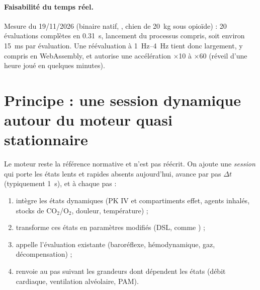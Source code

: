 \documentclass[10pt,a4paper]{article}
\newcommand{\vp}[1]{\text{\texttt{\detokenize{#1}}}}
\begin{document}
\paragraph{Faisabilité du temps réel.} Mesure du 19/11/2026 (binaire natif, \vp{vetsim-cli eval}, chien de \SI{20}{kg} sous opioïde) :
20 évaluations complètes en \SI{0,31}{s}, lancement du processus compris, soit environ \SI{15}{ms} par évaluation.
Une réévaluation à \SIrange{1}{4}{Hz} tient donc largement, y compris en WebAssembly, et autorise une accélération ×10 à ×60
(réveil d'une heure joué en quelques minutes).

\section{Principe : une session dynamique autour du moteur quasi stationnaire}

Le moteur reste la référence normative et n'est pas réécrit. On ajoute une \emph{session} qui porte les états lents et rapides
absents aujourd'hui, avance par pas $\Delta t$ (typiquement \SI{1}{s}), et à chaque pas :
\begin{enumerate}
\item intègre les états dynamiques (PK IV et compartiments effet, agents inhalés, stocks de CO$_2$/O$_2$, douleur, température) ;
\item transforme ces états en paramètres modifiés (DSL, comme \vp{apply_drug_effects}) ;
\item appelle l'évaluation existante (baroréflexe, hémodynamique, gaz, décompensation) ;
\item renvoie au pas suivant les grandeurs dont dépendent les états (débit cardiaque, ventilation alvéolaire, PAM).
\end{enumerate}

\begin{center}
\end{center}
\end{document}
